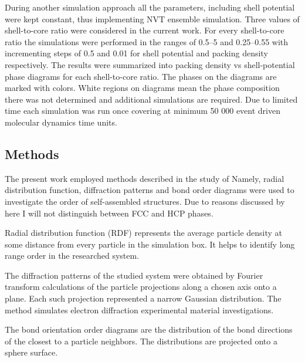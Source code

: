 
During another simulation approach all the parameters, including shell potential were kept constant, thus implementing NVT ensemble simulation. Three values of shell-to-core ratio were considered in the current work. For every shell-to-core ratio the simulations were performed in the ranges of 0.5--5 and 0.25--0.55 with incrementing steps of 0.5 and 0.01 for shell potential and packing density respectively. The results were summarized into packing density vs shell-potential phase diagrams for each shell-to-core ratio. %
The phases on the diagrams are marked with colors. White regions on diagrams mean the phase composition there was not determined and additional simulations are required. Due to limited time each simulation was run once covering at minimum 50 000 event driven molecular dynamics time units. 


\subsection{Methods}

The present work employed methods described in the study of \citet{methods} Namely, radial distribution function, diffraction patterns and bond order diagrams were used to investigate the order of self-assembled structures. Due to reasons discussed by \citet{engelscience} here I will not distinguish between FCC and HCP phases.

Radial distribution function (RDF) represents the average particle density at some distance from every particle in the simulation box. It helps to identify long range order in the researched system. %

The diffraction patterns of the studied system were obtained by Fourier transform calculations of the particle projections along a chosen axis onto a plane. Each such projection represented a narrow Gaussian distribution. The method simulates electron diffraction experimental material investigations.

The bond orientation order diagrams are the distribution of the bond directions of the closest to a particle neighbors. The distributions are projected onto a sphere surface. 